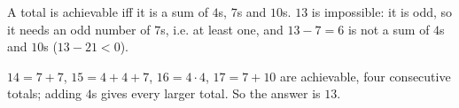 A total is achievable iff it is a sum of $4$s, $7$s and $10$s. $13$ is impossible: it is odd, so it needs an odd number of $7$s, i.e. at least one, and $13-7=6$ is not a sum of $4$s and $10$s ($13-21<0$).

$14=7+7$, $15=4+4+7$, $16=4\cdot4$, $17=7+10$ are achievable, four consecutive totals; adding $4$s gives every larger total. So the answer is $\boxed{13}$.
